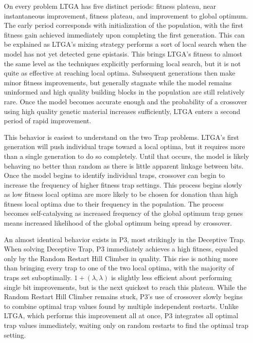 \documentclass[twoside]{article}
\begin{document}
On every problem LTGA has five distinct periods: fitness plateau, near instantaneous improvement, fitness plateau,
and improvement to global optimum. The early period corresponds with
initialization of the population, with the first fitness gain achieved immediately upon completing the first generation.
This can be explained as LTGA's mixing strategy performs a sort of local search when the model has not yet detected gene epistasis.
This brings LTGA's fitness to almost the same level as the techniques explicitly performing local search, but it is not quite
as effective at reaching local optima. Subsequent generations then make minor fitness improvements, but generally stagnate
while the model remains uninformed and high quality building blocks in the population are still relatively rare. Once the model
becomes accurate enough and the probability of a crossover using high quality genetic material increases sufficiently, LTGA
enters a second period of rapid improvement.

This behavior is easiest to understand on the two Trap problems. LTGA's first generation will push individual traps toward a
local optima, but it requires more than a single generation to do so completely. Until that occurs, the model is likely behaving
no better than random as there is little apparent linkage between bits. Once the model begins to identify individual traps, crossover
can begin to increase the frequency of higher fitness trap settings. This process begins slowly as low fitness local optima are more
likely to be chosen for donation than high fitness local optima due to their frequency in the population. The process becomes
self-catalysing as increased frequency of the global optimum trap genes means increased likelihood of the global optimum being spread by crossover.

An almost identical behavior exists in P3, most strikingly in the Deceptive Trap. When solving
Deceptive Trap, P3 immediately achieves a high fitness, equaled only by the Random Restart Hill Climber in quality. This rise is
nothing more than bringing every trap to one of the two local optima, with the majority of traps set suboptimally. $1+(\lambda, \lambda)$
is slightly less efficient about performing single bit improvements, but is the next quickest to reach this plateau.
While the Random Restart Hill Climber
remains stuck, P3's use of crossover slowly begins to combine optimal trap values found by multiple independent restarts. Unlike LTGA, which
performs this improvement all at once, P3 integrates all optimal trap values immediately, waiting only on random restarts to find
the optimal trap setting.
\end{document}
